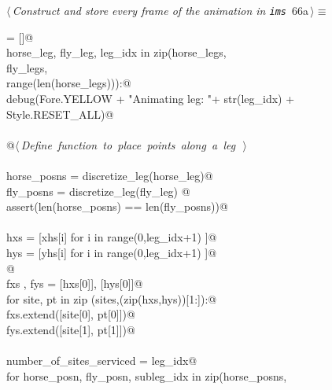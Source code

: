 \documentclass[11.5pt]{report}
\begin{document}
\begin{flushleft} \small
\begin{minipage}{\linewidth}\label{scrap95}\raggedright\small
{} $\langle\,${\itshape Construct and store every frame of the animation in \verb|ims|}\nobreak\ {\footnotesize {66a}}$\,\rangle\equiv$
\vspace{-1ex}
\begin{list}{}{} \item
\mbox{}\verb@ims = []@\\
\mbox{}\verb@for horse_leg, fly_leg, leg_idx in zip(horse_legs, \@\\
\mbox{}\verb@                                       fly_legs,   \@\\
\mbox{}\verb@                                       range(len(horse_legs))):@\\
\mbox{}\verb@     debug(Fore.YELLOW + "Animating leg: "+ str(leg_idx) + Style.RESET_ALL)@\\
\mbox{}\verb@@\\
\mbox{}\verb@     @\hbox{$\langle\,${\itshape Define function to place points along a leg}\nobreak\ {\footnotesize {}}$\,\rangle$}\verb@@\\
\mbox{}\verb@@\\
\mbox{}\verb@     horse_posns = discretize_leg(horse_leg)@\\
\mbox{}\verb@     fly_posns   = discretize_leg(fly_leg) @\\
\mbox{}\verb@     assert(len(horse_posns) == len(fly_posns))@\\
\mbox{}\verb@@\\
\mbox{}\verb@     hxs = [xhs[i] for i in range(0,leg_idx+1) ]@\\
\mbox{}\verb@     hys = [yhs[i] for i in range(0,leg_idx+1) ]@\\
\mbox{}\verb@           @\\
\mbox{}\verb@     fxs , fys = [hxs[0]], [hys[0]]@\\
\mbox{}\verb@     for site, pt in zip (sites,(zip(hxs,hys))[1:]):@\\
\mbox{}\verb@          fxs.extend([site[0], pt[0]])@\\
\mbox{}\verb@          fys.extend([site[1], pt[1]])@\\
\mbox{}\verb@@\\
\mbox{}\verb@     number_of_sites_serviced = leg_idx@\\
\mbox{}\verb@     for horse_posn, fly_posn, subleg_idx in zip(horse_posns, \@\\

\end{list}
\end{minipage}
\end{flushleft}
\end{document}
